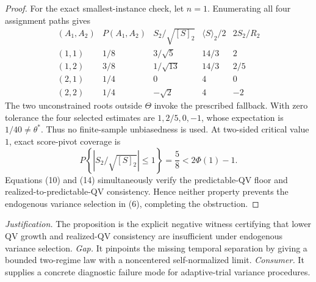 \documentclass{article}
\begin{document}
\begin{proof}
For the exact smallest-instance check, let \(n=1\).  Enumerating all four assignment paths gives
\[
\begin{array}{c|c|c|c|c}
(A_1,A_2)&P(A_1,A_2)&S_2/\sqrt{[S]_2}&\langle S\rangle_2/2&2S_2/R_2\\ \hline
(1,1)&1/8&3/\sqrt5&14/3&2\\
(1,2)&3/8&1/\sqrt{13}&14/3&2/5\\
(2,1)&1/4&0&4&0\\
(2,2)&1/4&-\sqrt2&4&-2
\end{array}
\tag{28}
\]
The two unconstrained roots outside \(\Theta\) invoke the prescribed fallback.  With zero tolerance the four selected estimates are \(1,2/5,0,-1\), whose expectation is \(1/40\ne\theta^*\).  Thus no finite-sample unbiasedness is used.  At two-sided critical value \(1\), exact score-pivot coverage is
\[
P\!\left\{\left|S_2/\sqrt{[S]_2}\right|\le1\right\}
=\frac58<2\Phi(1)-1.
\tag{29}
\]
Equations (10) and (14) simultaneously verify the predictable-QV floor and realized-to-predictable-QV consistency.  Hence neither property prevents the endogenous variance selection in (6), completing the obstruction.
\end{proof}
\par\smallskip\noindent \textit{Justification.} The proposition is the explicit negative witness certifying that lower QV growth and realized-QV consistency are insufficient under endogenous variance selection. \textit{Gap.} It pinpoints the missing temporal separation by giving a bounded two-regime law with a noncentered self-normalized limit. \textit{Consumer.} It supplies a concrete diagnostic failure mode for adaptive-trial variance procedures.
\end{document}
